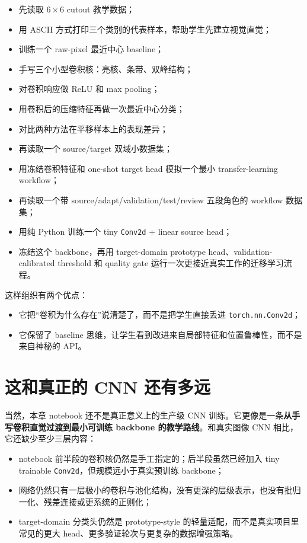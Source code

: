 \begin{itemize}
    \item 先读取 \(6\times 6\) cutout 教学数据；
    \item 用 ASCII 方式打印三个类别的代表样本，帮助学生先建立视觉直觉；
    \item 训练一个 raw-pixel 最近中心 baseline；
    \item 手写三个小型卷积核：亮核、条带、双峰结构；
    \item 对卷积响应做 ReLU 和 max pooling；
    \item 用卷积后的压缩特征再做一次最近中心分类；
    \item 对比两种方法在平移样本上的表现差异；
    \item 再读取一个 source/target 双域小数据集；
    \item 用冻结卷积特征和 one-shot target head 模拟一个最小 transfer-learning workflow；
    \item 再读取一个带 source/adapt/validation/test/review 五段角色的 workflow 数据集；
    \item 用纯 Python 训练一个 tiny \texttt{Conv2d} + linear source head；
    \item 冻结这个 backbone，再用 target-domain prototype head、validation-calibrated threshold 和 quality gate 运行一次更接近真实工作的迁移学习流程。
\end{itemize}

这样组织有两个优点：

\begin{itemize}
    \item 它把“卷积为什么存在”说清楚了，而不是把学生直接丢进 \texttt{torch.nn.Conv2d}；
    \item 它保留了 baseline 思维，让学生看到改进来自局部特征和位置鲁棒性，而不是来自神秘的 API。
\end{itemize}

\section{这和真正的 CNN 还有多远}

当然，本章 notebook 还不是真正意义上的生产级 CNN 训练。它更像是一条\textbf{从手写卷积直觉过渡到最小可训练 backbone 的教学路线}。和真实图像 CNN 相比，它还缺少至少三层内容：

\begin{itemize}
    \item notebook 前半段的卷积核仍然是手工指定的；后半段虽然已经加入 tiny trainable \texttt{Conv2d}，但规模远小于真实预训练 backbone；
    \item 网络仍然只有一层极小的卷积与池化结构，没有更深的层级表示，也没有批归一化、残差连接或更系统的正则化；
    \item target-domain 分类头仍然是 prototype-style 的轻量适配，而不是真实项目里常见的更大 head、更多验证轮次与更复杂的数据增强策略。
\end{itemize}

